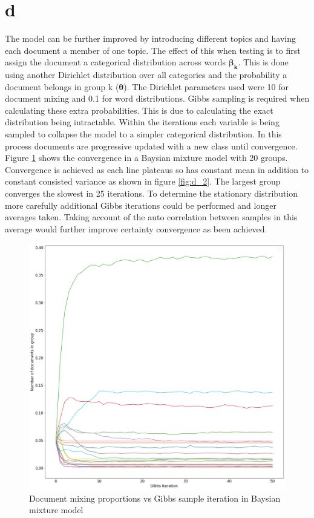 \documentclass[twoside,twocolumn]{article}
\begin{document}
\section{d}
The model can be further improved by introducing different topics and having each document a member of one topic. The effect of this when testing is to first assign the document a categorical distribution across words $\boldsymbol{\beta_k}$. This is done using another Dirichlet distribution over all categories and the probability a document belongs in group k ($\boldsymbol{\theta}$). The Dirichlet parameters used were 10 for document mixing and 0.1 for word distributions.
\newline
Gibbs sampling is required when calculating these extra probabilities. This is due to calculating the exact distribution being intractable. Within the iterations each variable is being sampled to collapse the model to a simpler categorical distribution. In this process documents are progressive updated with a new class until convergence. Figure \ref{fig:d_1} shows the convergence in a Baysian mixture model with 20 groups. Convergence is achieved as each line plateaus so has constant mean in addition to constant consisted variance as shown in figure \ref{fig:d_2}. The largest group converges the slowest in 25 iterations. To determine the stationary distribution more carefully additional Gibbs iterations could be performed and longer averages taken. Taking account of the auto correlation between samples in this average would further improve certainty convergence as been achieved.

\begin{figure}[h]
  \centering
    \includegraphics[width=\linewidth]{d_1}
  \caption{Document mixing proportions vs Gibbs sample iteration in Baysian mixture model}
  \label{fig:d_1}
\end{figure}
\end{document}

